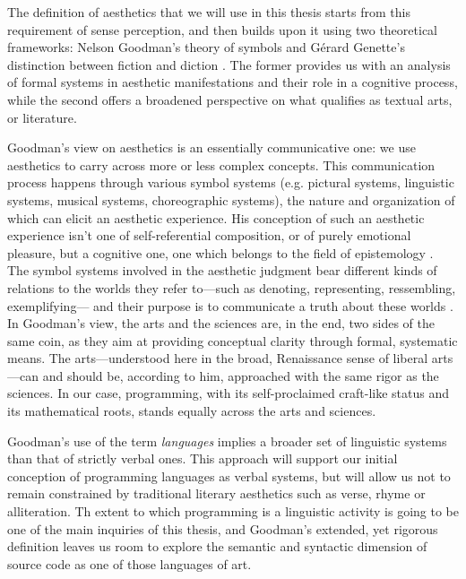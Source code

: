 The definition of aesthetics that we will use in this thesis starts from this requirement of sense perception, and then builds upon it using two theoretical frameworks: Nelson Goodman's theory of symbols \citep{goodman_languages_1976} and Gérard Genette's distinction between fiction and diction \citep{genette_fiction_1993}. The former provides us with an analysis of formal systems in aesthetic manifestations and their role in a cognitive process, while the second offers a broadened perspective on what qualifies as textual arts, or literature.

Goodman's view on aesthetics is an essentially communicative one: we use aesthetics to carry across more or less complex concepts. This communication process happens through various symbol systems (e.g. pictural systems, linguistic systems, musical systems, choreographic systems), the nature and organization of which can elicit an aesthetic experience. His conception of such an aesthetic experience isn't one of self-referential composition, or of purely emotional pleasure, but a cognitive one, one which belongs to the field of epistemology \citep{goodman_languages_1976}. The symbol systems involved in the aesthetic judgment bear different kinds of relations to the worlds they refer to—such as denoting, representing, ressembling, exemplifying— and their purpose is to communicate a truth about these worlds \citep{goodman_ways_1978}. In Goodman's view, the arts and the sciences are, in the end, two sides of the same coin, as they aim at providing conceptual clarity through formal, systematic means. The arts—understood here in the broad, Renaissance sense of liberal arts—can and should be, according to him, approached with the same rigor as the sciences. In our case, programming, with its self-proclaimed craft-like status and its mathematical roots, stands equally across the arts and sciences.

Goodman's use of the term \emph{languages} implies a broader set of linguistic systems than that of strictly verbal ones. This approach will support our initial conception of programming languages as verbal systems, but will allow us not to remain constrained by traditional literary aesthetics such as verse, rhyme or alliteration. Th extent to which programming is a linguistic activity is going to be one of the main inquiries of this thesis, and Goodman's extended, yet rigorous definition leaves us room to explore the semantic and syntactic dimension of source code as one of those languages of art.

